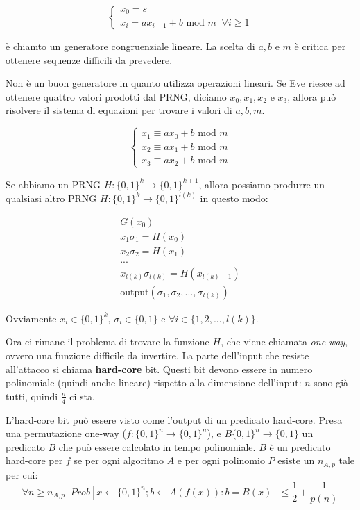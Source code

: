 \[
\begin{cases}
x_0 = s \\ 
x_i = ax_{i-1} + b \text { mod } m \; \; \forall i \geq 1
\end{cases}
\]

è chiamto un generatore congruenziale lineare.
La scelta di $a, b$ e $m$ è critica per ottenere sequenze difficili da prevedere.

Non è un buon generatore in quanto utilizza operazioni lineari. Se Eve riesce ad ottenere quattro valori prodotti dal PRNG, diciamo $x_0, x_1, x_2$ e $x_3$, allora può risolvere il sistema di equazioni per trovare i valori di $a, b, m$.

\[
\begin{cases}
x_1 \equiv ax_0 + b \text{ mod } m\\
x_2 \equiv ax_1 + b \text{ mod } m\\
x_3 \equiv ax_2 + b \text{ mod } m
\end{cases}
\]

Se abbiamo un PRNG $H: \{0,1\}^k \rightarrow \{0,1\}^{k+1}$, allora possiamo produrre un qualsiasi altro PRNG $H:\{0,1\}^k \rightarrow \{0,1\}^{l(k)}$ in questo modo:

\begin{align*}
G(x_0)\\
x_1\sigma_1 = H(x_0)\\
x_2\sigma_2 = H(x_1)\\
...\\
x_{l(k)}\sigma_{l(k)} = H(x_{l(k)-1})\\
\text{output} (\sigma_1, \sigma_2, ..., \sigma_{l(k)})
\end{align*}

Ovviamente $x_i \in \{0,1\}^k$, $\sigma_i \in \{0,1\}$ e $\forall i \in \{1, 2, ..., l(k)\}$.

Ora ci rimane il problema di trovare la funzione $H$, che viene chiamata \textit{one-way}, ovvero una funzione difficile da invertire. La parte dell'input che resiste all'attacco si chiama \textbf{hard-core} bit. Questi bit devono essere in numero polinomiale (quindi anche lineare) rispetto alla dimensione dell'input: $n$ sono già tutti, quindi $\frac{n}{4}$ ci sta.


L'hard-core bit può essere visto come l'output di un predicato hard-core. Presa una permutazione one-way ($f: \{0,1\}^n \rightarrow \{0,1\}^n$), e $B\{0,1\}^n \rightarrow \{0,1\}$ un predicato $B$ che può essere calcolato in tempo polinomiale. $B$ è un predicato hard-core per $f$ se per ogni algoritmo $A$ e per ogni polinomio $P$ esiste un $n_{A,p}$ tale per cui:
\begin{equation*}
\forall n \geq n_{A,p} \;\; Prob[x \leftarrow \{0,1\}^n;  b \leftarrow A(f(x)) : b = B(x)] \leq \frac12 + \frac1{p(n)}
\end{equation*}

